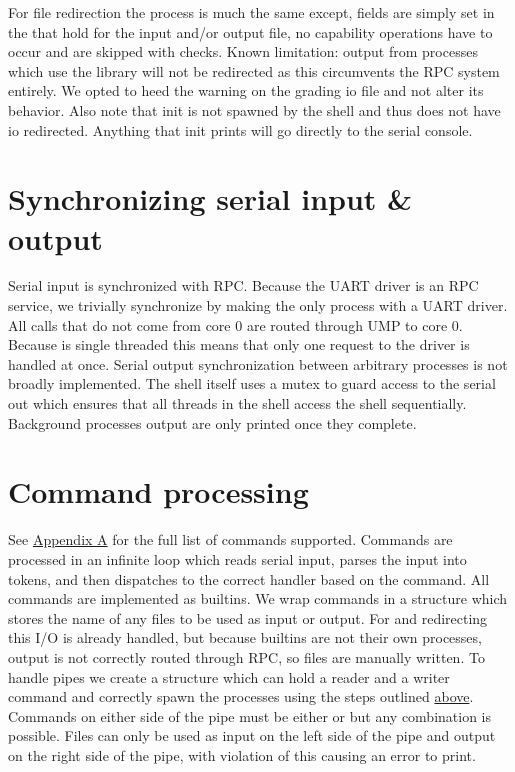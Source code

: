 For file redirection the process is much the same except, fields are simply set in the  that hold
 for the input and/or output file, no capability operations have to occur and are skipped with  checks. 
 \newline
 \newline
 Known limitation: output from processes which use the  library will not be redirected
 as this circumvents the RPC system entirely. We opted to heed the warning on the grading io file and not alter its behavior.
 Also note that init is not spawned by the shell and thus does not have io redirected. Anything that
 init prints will go directly to the serial console.



\section{Synchronizing serial input \& output}
Serial input is synchronized with RPC. Because the UART driver is an RPC service, we trivially synchronize
by making  the only process with a UART driver. All calls that do not come from core 0 are routed through UMP
to core 0. Because  is single threaded this means that only one request to the driver is handled at once. Serial output 
synchronization between arbitrary processes is not broadly implemented. The shell itself uses a mutex to guard access to the 
serial out which ensures that all threads in the shell access the shell sequentially. Background processes output are only printed
once they complete. 

\section{Command processing}
See \hyperref[appA]{Appendix A} for the full list of commands supported. Commands are processed in an infinite loop which reads serial input, parses the
input into tokens, and then dispatches to the correct handler based on the command.
All commands are implemented as builtins. We wrap commands in a structure which stores
the name of any files to be used as input or output. For  and  redirecting
this I/O is already handled, but because builtins are not their own processes, output is not correctly
routed through RPC, so files are manually written. To handle pipes we create a structure which can 
hold a reader and a writer command and correctly spawn the processes using the steps outlined \hyperref[pipe_steps]{above}.
Commands on either side of the pipe must be either  or  but any combination is 
possible. Files can only be used as input on the left side of the pipe and output on the right side of the pipe,
with violation of this causing an error to print. 

